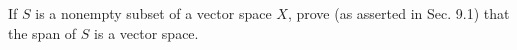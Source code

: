 \begin{exercise}
	If $S$ is a nonempty subset of a vector space $X$, prove (as asserted in Sec. 9.1) that the span of $S$ is a vector space.
\end{exercise}

